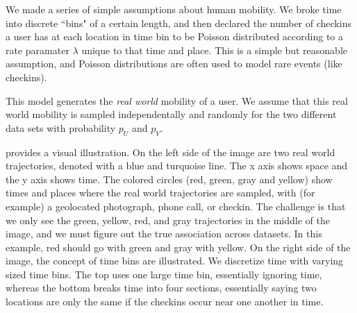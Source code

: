 We made a series of simple assumptions about human mobility.
We broke time into discrete ``bins" of a certain length, and then declared the number of checkins a user has at each location in time bin to be Poisson distributed according to a rate paramater $\lambda$ unique to that time and place.
This is a simple but reasonable assumption, and Poisson distributions are often used to model rare events (like checkins).

This model generates the \emph{real world} mobility of a user.
We assume that this real world mobility is sampled independentally and randomly for the two different data sets with probability $p_U$ and $p_V$.

 provides a visual illustration.
On the left side of the image are two real world trajectories, denoted with a blue and turquoise line.
The x axis shows space and the y axis shows time.
The colored circles (red, green, gray and yellow) show times and places where the real world trajectories are sampled, with (for example) a geolocated photograph, phone call, or checkin.
The challenge is that we only see the green, yellow, red, and gray trajectories in the middle of the image, and we must figure out the true association across datasets.
In this example, red should go with green and gray with yellow.
On the right side of the image, the concept of time bins are illustrated.
We discretize time with varying sized time bins.
The top uses one large time bin, essentially ignoring time, whereas the bottom breaks time into four sections, essentially saying two locations are only the same if the checkins occur near one another in time.



